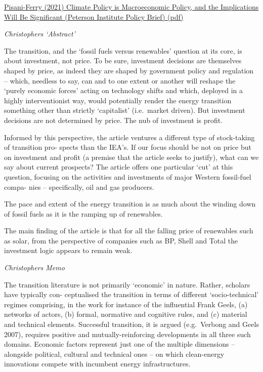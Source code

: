 \documentclass[
]{book}
\begin{document}
\href{pdf/Pisani-Ferry_2021_Climate_Policy_is_macroeconomic_Policy.pdf}{Pisani-Ferry (2021) Climate Policy is Macroeconomic Policy, and the Implications Will Be Significant (Peterson Institute Policy Brief) (pdf)}

\emph{Christophers `Abstract'}

The transition, and the `fossil fuels versus renewables' question at its core, is about
investment, not price.
To be sure, investment decisions are themselves shaped by price, as indeed
they are shaped by government policy and regulation --
which, needless to say, can and to one extent or another
will reshape the `purely economic forces' acting on technology shifts
and which,
deployed in a highly interventionist way, would potentially render
the energy transition something other than strictly `capitalist' (i.e.~market driven).
But investment decisions are not determined by price. The nub of investment is proﬁt.

Informed by this perspective, the article ventures a diﬀerent type of stock-taking of transition pro-
spects than the IEA's. If our focus should be not on price but on investment and proﬁt (a premise that
the article seeks to justify), what can we say about current prospects? The article oﬀers one particular
`cut' at this question, focusing on the activities and investments of major Western fossil-fuel compa-
nies -- speciﬁcally, oil and gas producers.

The pace and extent of the energy transition is as much about the winding
down of fossil fuels as it is the ramping up of renewables.

The main ﬁnding of the article is that for all the falling price of renewables such as solar, from the
perspective of companies such as BP, Shell and Total the investment logic appears to remain weak.

\emph{Christophers Memo}

The transition literature is not primarily `economic' in nature. Rather, scholars have typically con-
ceptualised the transition in terms of diﬀerent `socio-technical' regimes comprising, in the work for
instance of the inﬂuential Frank Geels, (a) networks of actors, (b) formal, normative and cognitive
rules, and (c) material and technical elements. Successful transition, it is argued (e.g.~Verbong and
Geels 2007), requires positive and mutually-reinforcing developments in all three such domains.
Economic factors represent just one of the multiple dimensions -- alongside political, cultural and
technical ones -- on which clean-energy innovations compete with incumbent energy
infrastructures.
\end{document}
